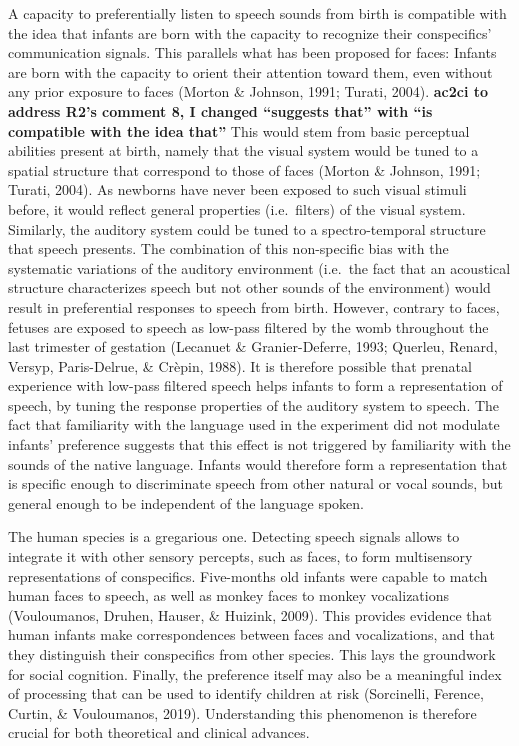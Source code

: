 \documentclass[
  english,
  man]{apa6}
\begin{document}
A capacity to preferentially listen to speech sounds from birth is compatible with the idea that infants are born with the capacity to recognize their conspecifics' communication signals. This parallels what has been proposed for faces: Infants are born with the capacity to orient their attention toward them, even without any prior exposure to faces (Morton \& Johnson, 1991; Turati, 2004).
\textbf{ac2ci to address R2's comment 8, I changed ``suggests that'' with ``is compatible with the idea that''}
This would stem from basic perceptual abilities present at birth, namely that the visual system would be tuned to a spatial structure that correspond to those of faces (Morton \& Johnson, 1991; Turati, 2004). As newborns have never been exposed to such visual stimuli before, it would reflect general properties (i.e.~filters) of the visual system. Similarly, the auditory system could be tuned to a spectro-temporal structure that speech presents. The combination of this non-specific bias with the systematic variations of the auditory environment (i.e.~the fact that an acoustical structure characterizes speech but not other sounds of the environment) would result in preferential responses to speech from birth. However, contrary to faces, fetuses are exposed to speech as low-pass filtered by the womb throughout the last trimester of gestation (Lecanuet \& Granier-Deferre, 1993; Querleu, Renard, Versyp, Paris-Delrue, \& Crèpin, 1988). It is therefore possible that prenatal experience with low-pass filtered speech helps infants to form a representation of speech, by tuning the response properties of the auditory system to speech.
The fact that familiarity with the language used in the experiment did not modulate infants' preference suggests that this effect is not triggered by familiarity with the sounds of the native language. Infants would therefore form a representation that is specific enough to discriminate speech from other natural or vocal sounds, but general enough to be independent of the language spoken.

The human species is a gregarious one. Detecting speech signals allows to integrate it with other sensory percepts, such as faces, to form multisensory representations of conspecifics. Five-months old infants were capable to match human faces to speech, as well as monkey faces to monkey vocalizations (Vouloumanos, Druhen, Hauser, \& Huizink, 2009). This provides evidence that human infants make correspondences between faces and vocalizations, and that they distinguish their conspecifics from other species. This lays the groundwork for social cognition. Finally, the preference itself may also be a meaningful index of processing that can be used to identify children at risk (Sorcinelli, Ference, Curtin, \& Vouloumanos, 2019). Understanding this phenomenon is therefore crucial for both theoretical and clinical advances.
\end{document}
